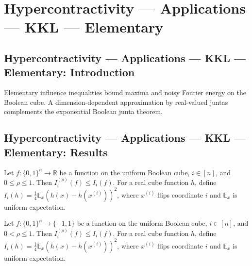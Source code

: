 \section{Hypercontractivity --- Applications --- KKL --- Elementary}
\subsection*{Hypercontractivity --- Applications --- KKL --- Elementary: Introduction}
Elementary influence inequalities bound maxima and noisy Fourier energy on the Boolean cube. A dimension-dependent approximation by real-valued juntas complements the exponential Boolean junta theorem.

\subsection*{Hypercontractivity --- Applications --- KKL --- Elementary: Results}

\begin{lemma}
\leanok
{}
\label{KKL.noisyInfluence_le_influence}
Let $f:\{0,1\}^n\to\mathbb R$ be a function on the uniform Boolean cube, $i\in[n]$, and
$0\le\rho\le1$. Then $I_i^{(\rho)}(f)\le I_i(f)$. For a real cube function $h$, define
$I_i(h)=\tfrac14\mathbb E_x(h(x)-h(x^{(i)}))^2$, where $x^{(i)}$ flips coordinate $i$
and $\mathbb E_x$ is uniform expectation.
\end{lemma}

\begin{lemma}
\leanok
{}
\label{KKL.noisyInfluence_power_bound}
Let $f:\{0,1\}^n\to\{-1,1\}$ be a function on the uniform Boolean cube, $i\in[n]$, and
$0<\rho\le1$. Then $I_i^{(\rho)}(f)\le I_i(f)$. For a real cube function $h$, define
$I_i(h)=\tfrac14\mathbb E_x(h(x)-h(x^{(i)}))^2$, where $x^{(i)}$ flips coordinate $i$
and $\mathbb E_x$ is uniform expectation.
\end{lemma}

